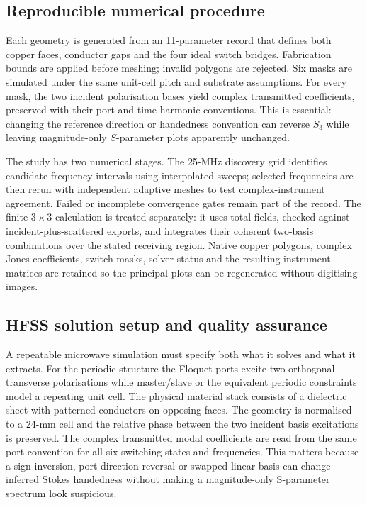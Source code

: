 \documentclass{ieeeaccess}
\begin{document}
\subsection{Reproducible numerical procedure}
Each geometry is generated from an 11-parameter record that defines both copper faces, conductor gaps and the four ideal switch bridges. Fabrication bounds are applied before meshing; invalid polygons are rejected. Six masks are simulated under the same unit-cell pitch and substrate assumptions. For every mask, the two incident polarisation bases yield complex transmitted coefficients, preserved with their port and time-harmonic conventions. This is essential: changing the reference direction or handedness convention can reverse $S_3$ while leaving magnitude-only $S$-parameter plots apparently unchanged.

The study has two numerical stages. The 25-MHz discovery grid identifies candidate frequency intervals using interpolated sweeps; selected frequencies are then rerun with independent adaptive meshes to test complex-instrument agreement. Failed or incomplete convergence gates remain part of the record. The finite $3\times3$ calculation is treated separately: it uses total fields, checked against incident-plus-scattered exports, and integrates their coherent two-basis combinations over the stated receiving region. Native copper polygons, complex Jones coefficients, switch masks, solver status and the resulting instrument matrices are retained so the principal plots can be regenerated without digitising images.

\subsection{HFSS solution setup and quality assurance}
A repeatable microwave simulation must specify both what it solves and what it extracts. For the periodic structure the Floquet ports excite two orthogonal transverse polarisations while master/slave or the equivalent periodic constraints model a repeating unit cell. The physical material stack consists of a dielectric sheet with patterned conductors on opposing faces. The geometry is normalised to a 24-mm cell and the relative phase between the two incident basis excitations is preserved. The complex transmitted modal coefficients are read from the same port convention for all six switching states and frequencies. This matters because a sign inversion, port-direction reversal or swapped linear basis can change inferred Stokes handedness without making a magnitude-only S-parameter spectrum look suspicious.
\end{document}
